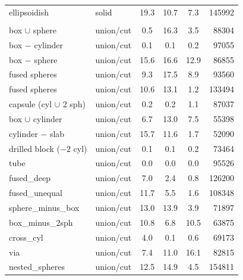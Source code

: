 \begin{table}[H]
\begin{tabularx}{\textwidth}{@{}l L c c c r@{}}
\quad ellipsoidish & solid & 19.3 & 10.7 & 7.3 & 145992\\
\addlinespace
{}\\
\quad box $\cup$ sphere & union/cut & 0.5 & 16.3 & 3.5 & 88304\\
\quad box $-$ cylinder & union/cut & 0.1 & 0.1 & 0.2 & 97055\\
\quad box $-$ sphere & union/cut & 15.6 & 16.6 & 12.9 & 86855\\
 fused spheres & union/cut & 9.3 & 17.5 & 8.9 & 93560\\
 fused spheres & union/cut & 10.6 & 13.1 & 1.2 & 133494\\
\quad capsule (cyl $\cup$ 2 sph) & union/cut & 0.2 & 0.2 & 1.1 & 87037\\
\quad box $\cup$ cylinder & union/cut & 6.7 & 13.0 & 7.5 & 55398\\
\quad cylinder $-$ slab & union/cut & 15.7 & 11.6 & 1.7 & 52090\\
\quad drilled block ($-$2 cyl) & union/cut & 0.1 & 0.1 & 0.2 & 73464\\
\quad tube & union/cut & 0.0 & 0.0 & 0.0 & 95526\\
\quad fused\_deep & union/cut & 7.0 & 2.4 & 0.8 & 126200\\
\quad fused\_unequal & union/cut & 11.7 & 5.5 & 1.6 & 108348\\
\quad sphere\_minus\_box & union/cut & 13.0 & 13.9 & 3.9 & 71897\\
\quad box\_minus\_2sph & union/cut & 10.8 & 6.8 & 10.5 & 63875\\
\quad cross\_cyl & union/cut & 4.0 & 0.1 & 0.6 & 69173\\
\quad via & union/cut & 7.4 & 11.0 & 16.1 & 82815\\
\quad nested\_spheres & union/cut & 12.5 & 14.9 & 4.5 & 154811\\
\bottomrule
\end{tabularx}
\end{table}
